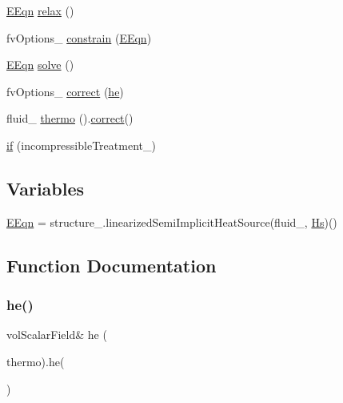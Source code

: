\begin{DoxyCompactItemize}
\item 
\hyperlink{EEqn__1pl_8H_afbe3b0df5936ee9102f8bea26f93e95a}{E\+Eqn} \hyperlink{EEqn__1pl_8H_a9b1e3cf7921c1d57830a6970779f3d24}{relax} ()
\item 
fv\+Options\+\_\+ \hyperlink{EEqn__1pl_8H_ada92f4bf542de36f5c56f50ac3bd22da}{constrain} (\hyperlink{EEqn__1pl_8H_afbe3b0df5936ee9102f8bea26f93e95a}{E\+Eqn})
\item 
\hyperlink{EEqn__1pl_8H_afbe3b0df5936ee9102f8bea26f93e95a}{E\+Eqn} \hyperlink{EEqn__1pl_8H_ac123867940006fb14e8346d9bdc38f8d}{solve} ()
\item 
fv\+Options\+\_\+ \hyperlink{EEqn__1pl_8H_aa9a0425f27ee9f8374f7b6896dc8bacc}{correct} (\hyperlink{EEqn__1pl_8H_aaacc8fea926e2b83e418a1ad3c1e8c43}{he})
\item 
fluid\+\_\+ \hyperlink{EEqn__1pl_8H_a353366dbdc7c1ce1987281023b85fa83}{thermo} ().\hyperlink{hEqn_8H_a3a2458f7f54158be848527a3fdedd5dd}{correct}()
\item 
\hyperlink{EEqn__1pl_8H_a37319901bc0705f6b6d30d30fdcdf333}{if} (incompressible\+Treatment\+\_\+)
\end{DoxyCompactItemize}
\subsection*{Variables}
\begin{DoxyCompactItemize}
\item 
\hyperlink{EEqn__1pl_8H_a48cf446ed1abc619ddcfc2b831bf4ed9}{E\+Eqn} = structure\+\_\+.\+linearized\+Semi\+Implicit\+Heat\+Source(fluid\+\_\+, \hyperlink{EEqn__1pl_8H_ab8fc5669aa3ba2d4b66ff43ff446d633}{Hs})()
\end{DoxyCompactItemize}


\subsection{Function Documentation}
\mbox{\label{EEqn__1pl_8H_aaacc8fea926e2b83e418a1ad3c1e8c43}} 
\subsubsection{\texorpdfstring{he()}{he()}}
{\footnotesize\ttfamily vol\+Scalar\+Field\& he (\begin{DoxyParamCaption}\item[{fluid\+\_\+.}]{thermo).\+he( }\end{DoxyParamCaption})}

